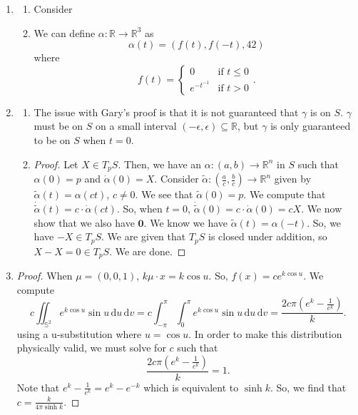 \documentclass[12pt]{article}
\begin{document}
\begin{enumerate}[label=\Alph*., leftmargin=*]
    \item \begin{enumerate}
        \item Consider \vspace{2in}
        \item We can define $\alpha:\mathbb{R}\to\mathbb{R}^{3}$ as\begin{equation*}
            \alpha(t)= (f (t),f (-t),42)
        \end{equation*} where\begin{equation*}
            f(t)=\begin{cases}
                0&\text{if }t\leq 0\\
                e^{-t^{-1}}&\text{if }t>0
            \end{cases}.
        \end{equation*}
    \end{enumerate}
    \item \begin{enumerate}
        \item The issue with Gary's proof is that it is not guaranteed that $\gamma$ is on $S$. $\gamma$ must be on $S$ on a small interval $(-\epsilon, \epsilon)\subseteq \mathbb{R}$, but $\gamma$ is only guaranteed to be on $S$ when $t=0$.
        \item \begin{proof}
            Let $X\in T_{p}S$. Then, we have an $\alpha: (a,b)\to\mathbb{R}^n$ in $S$ such that $\alpha(0)=p$ and $\dot{\alpha}(0)=X$. Consider $\tilde{\alpha}:(\frac{a}{c},\frac{b}{c})\to \mathbb{R}^{n}$ given by $\tilde{\alpha}(t)=\alpha(ct)$, $c\neq0$. We see that ${\tilde{\alpha}}(0)=p$. We compute that $\dot{\tilde{\alpha}}(t)=c\cdot\dot{\alpha}(ct)$. So, when $t=0$,
            $\dot{\tilde{\alpha}}(0)=c\cdot\dot{\alpha}(0)=cX$. We now show that we also have $\mathbf{0}$. We know we have $\tilde{\alpha}(t)=\alpha(-t)$. So, we have $-X\in T_{p}S$. We are given that $T_{p}S$ is closed under addition, so $X-X=0\in T_{p}S$. We are done. 
        \end{proof}
    \end{enumerate}
    \item \begin{proof}
        When $\mu=(0,0,1)$, $k\mu\cdot x=k\cos u$. So, $f(x)=ce^{k\cos u}$. We compute\begin{equation*}
            c\iint_{\mathbb{S}^2}e^{k\cos u}\sin u\, \mathrm{d}u \, \mathrm{d}v=c\int_{-\pi}^{\pi} \int_{0}^{\pi} e^{k\cos u}\sin u \, \mathrm{d}u \, \mathrm{d}v=\frac{2c\pi(e^k-\frac{1}{e^k})}{k}.
        \end{equation*} using a u-substitution where $u=\cos u$. In order to make this distribution physically valid, we must solve for $c$ such that \begin{equation*}
            \frac{2c\pi(e^k-\frac{1}{e^k})}{k}=1.
        \end{equation*} Note that $e^k-\frac{1}{e^k}=e^k-e^{-k}$ which is equivalent to $\sinh{k}$. So, we find that $c=\frac{k}{4\pi\sinh k}$.
    \end{proof}
\end{enumerate}
\end{document}

